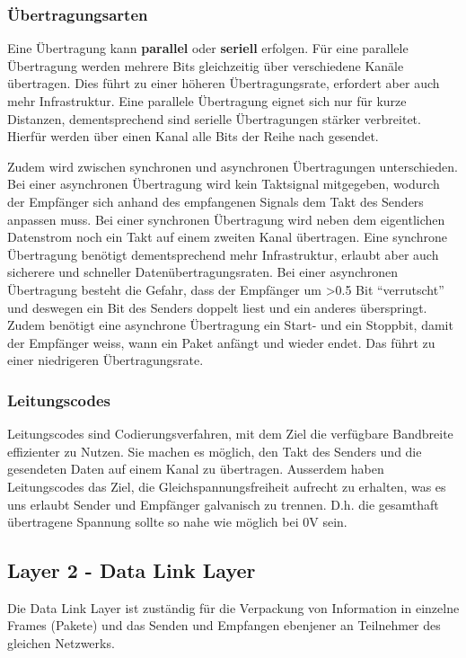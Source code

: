 \documentclass{article}
\begin{document}
\subsubsection{Übertragungsarten}
Eine Übertragung kann \textbf{parallel} oder \textbf{seriell} erfolgen. Für eine parallele Übertragung werden mehrere Bits gleichzeitig über verschiedene Kanäle übertragen. Dies führt zu einer höheren Übertragungsrate, erfordert aber auch mehr Infrastruktur. Eine parallele Übertragung eignet sich nur für kurze Distanzen, dementsprechend sind serielle Übertragungen stärker verbreitet. Hierfür werden über einen Kanal alle Bits der Reihe nach gesendet.

Zudem wird zwischen synchronen und asynchronen Übertragungen unterschieden. Bei einer asynchronen Übertragung wird kein Taktsignal mitgegeben, wodurch der Empfänger sich anhand des empfangenen Signals dem Takt des Senders anpassen muss. Bei einer synchronen Übertragung wird neben dem eigentlichen Datenstrom noch ein Takt auf einem zweiten Kanal übertragen. Eine synchrone Übertragung benötigt dementsprechend mehr Infrastruktur, erlaubt aber auch sicherere und schneller Datenübertragungsraten. Bei einer asynchronen Übertragung besteht die Gefahr, dass der Empfänger um >0.5 Bit ``verrutscht'' und deswegen ein Bit des Senders doppelt liest und ein anderes überspringt. Zudem benötigt eine asynchrone Übertragung ein Start- und ein Stoppbit, damit der Empfänger weiss, wann ein Paket anfängt und wieder endet. Das führt zu einer niedrigeren Übertragungsrate.

\subsubsection{Leitungscodes}
Leitungscodes sind Codierungsverfahren, mit dem Ziel die verfügbare Bandbreite effizienter zu Nutzen. Sie machen es möglich, den Takt des Senders und die gesendeten Daten auf einem Kanal zu übertragen. Ausserdem haben Leitungscodes das Ziel, die Gleichspannungsfreiheit aufrecht zu erhalten, was es uns erlaubt Sender und Empfänger galvanisch zu trennen. D.h. die gesamthaft übertragene Spannung sollte so nahe wie möglich bei 0V sein.
\subsection{Layer 2 - Data Link Layer}
Die Data Link Layer ist zuständig für die Verpackung von Information in einzelne Frames (Pakete) und das Senden und Empfangen ebenjener an Teilnehmer des gleichen Netzwerks.
\end{document}
